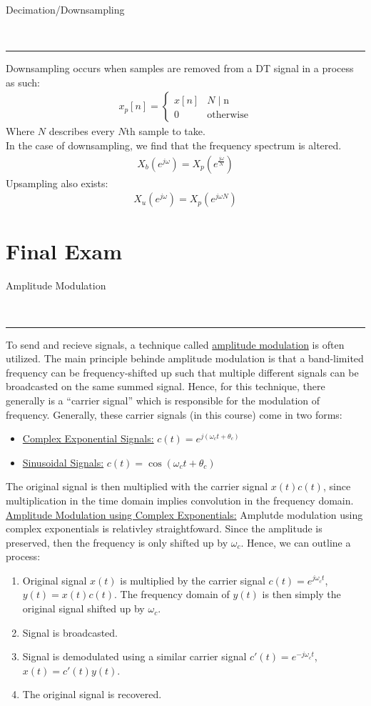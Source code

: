 \documentclass{article}
\newcommand{\sheader}[1]{\underline{#1:}}
\newcommand{\ejw}{{e^\jomega}}
\newcommand{\header}[1]{\begin{large}\noindent #1\end{large}\\\rule{\textwidth}{0.5pt}}
\newcommand{\gap}{\medskip\\}
\newcommand{\jomega}{{j\omega}}
\begin{document}
\header{Decimation/Downsampling}
Downsampling occurs when samples are removed from a DT signal in a process as such:
\begin{align*}
    x_p[n] = \begin{cases}
        x[n] & N \mid \textrm{n}\\
        0 & \textrm{otherwise}
    \end{cases}
\end{align*}
Where $N$ describes every $N$th sample to take. 
\gap
In the case of downsampling, we find that the frequency spectrum is altered.
\begin{align*}
    X_b(\ejw) = X_p(e^{\frac{\jomega}{N}})
\end{align*}
Upsampling also exists:
\begin{align*}
    X_u(\ejw) = X_p(e^{\jomega N})
\end{align*}

\pagebreak

\section*{Final Exam}

\header{Amplitude Modulation}

To send and recieve signals, a technique called \underline{amplitude modulation} is often 
utilized. The main principle behinde amplitude modulation is that a band-limited frequency
can be frequency-shifted up such that multiple different signals can be broadcasted on the 
same summed signal. Hence, for this technique, there generally is a ``carrier signal''
which is responsible for the modulation of frequency. Generally, these carrier signals 
(in this course) come in two forms:
\begin{itemize}
    \item \sheader{Complex Exponential Signals} $\displaystyle c(t) = e^{j(\omega_c t + \theta_c)}$
    \item \sheader{Sinusoidal Signals} $\displaystyle c(t) = \cos(\omega_c t + \theta_c)$
\end{itemize}
The original signal is then multiplied with the carrier signal $x(t)c(t)$, since 
multiplication in the time domain implies convolution in the frequency domain.
\gap
\sheader{Amplitude Modulation using Complex Exponentials} Amplutde modulation using 
complex exponentials is relativley straightfoward. Since the amplitude is preserved,
then the frequency is only shifted up by $\omega_c$. Hence, we can outline a process:
\begin{enumerate}
    \item Original signal $x(t)$ is multiplied by the carrier signal $c(t) = e^{\jomega_c t}$, $y(t) = x(t)c(t)$.
    The frequency domain of $y(t)$ is then simply the original signal shifted up by $\omega_c$.
    \item Signal is broadcasted.
    \item Signal is demodulated using a similar carrier signal $c'(t) = e^{-\jomega_c t}$, $x(t) = c'(t)y(t)$.
    \item The original signal is recovered.
\end{enumerate}
\end{document}
